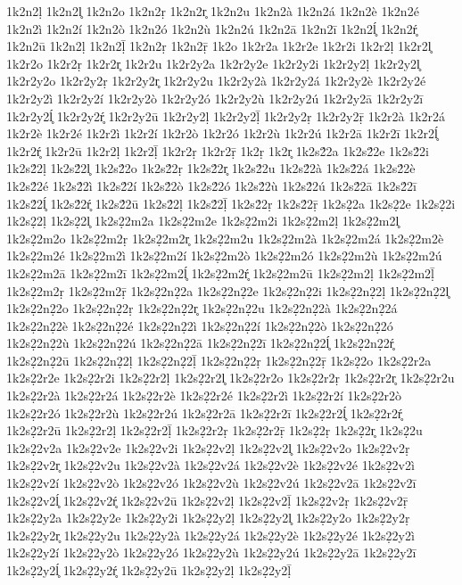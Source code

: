 {1k2n2ḷ
1k2n2l̥
1k2n2o
1k2n2ṛ
1k2n2r̥
1k2n2u
1k2n2à
1k2n2á
1k2n2è
1k2n2é
1k2n2ì
1k2n2í
1k2n2ò
1k2n2ó
1k2n2ù
1k2n2ú
1k2n2ā
1k2n2ī
1k2n2ĺ̥
1k2n2ŕ̥
1k2n2ū
1k2n2ḷ
1k2n2ḹ
1k2n2ṛ
1k2n2ṝ
1k2o
1k2r2a
1k2r2e
1k2r2i
1k2r2ḷ
1k2r2l̥
1k2r2o
1k2r2ṛ
1k2r2r̥
1k2r2u
1k2r2y2a
1k2r2y2e
1k2r2y2i
1k2r2y2ḷ
1k2r2y2l̥
1k2r2y2o
1k2r2y2ṛ
1k2r2y2r̥
1k2r2y2u
1k2r2y2à
1k2r2y2á
1k2r2y2è
1k2r2y2é
1k2r2y2ì
1k2r2y2í
1k2r2y2ò
1k2r2y2ó
1k2r2y2ù
1k2r2y2ú
1k2r2y2ā
1k2r2y2ī
1k2r2y2ĺ̥
1k2r2y2ŕ̥
1k2r2y2ū
1k2r2y2ḷ
1k2r2y2ḹ
1k2r2y2ṛ
1k2r2y2ṝ
1k2r2à
1k2r2á
1k2r2è
1k2r2é
1k2r2ì
1k2r2í
1k2r2ò
1k2r2ó
1k2r2ù
1k2r2ú
1k2r2ā
1k2r2ī
1k2r2ĺ̥
1k2r2ŕ̥
1k2r2ū
1k2r2ḷ
1k2r2ḹ
1k2r2ṛ
1k2r2ṝ
1k2ṛ
1k2r̥
1k2s2́2a
1k2s2́2e
1k2s2́2i
1k2s2́2ḷ
1k2s2́2l̥
1k2s2́2o
1k2s2́2ṛ
1k2s2́2r̥
1k2s2́2u
1k2s2́2à
1k2s2́2á
1k2s2́2è
1k2s2́2é
1k2s2́2ì
1k2s2́2í
1k2s2́2ò
1k2s2́2ó
1k2s2́2ù
1k2s2́2ú
1k2s2́2ā
1k2s2́2ī
1k2s2́2ĺ̥
1k2s2́2ŕ̥
1k2s2́2ū
1k2s2́2ḷ
1k2s2́2ḹ
1k2s2́2ṛ
1k2s2́2ṝ
1k2s2̣2a
1k2s2̣2e
1k2s2̣2i
1k2s2̣2ḷ
1k2s2̣2l̥
1k2s2̣2m2a
1k2s2̣2m2e
1k2s2̣2m2i
1k2s2̣2m2ḷ
1k2s2̣2m2l̥
1k2s2̣2m2o
1k2s2̣2m2ṛ
1k2s2̣2m2r̥
1k2s2̣2m2u
1k2s2̣2m2à
1k2s2̣2m2á
1k2s2̣2m2è
1k2s2̣2m2é
1k2s2̣2m2ì
1k2s2̣2m2í
1k2s2̣2m2ò
1k2s2̣2m2ó
1k2s2̣2m2ù
1k2s2̣2m2ú
1k2s2̣2m2ā
1k2s2̣2m2ī
1k2s2̣2m2ĺ̥
1k2s2̣2m2ŕ̥
1k2s2̣2m2ū
1k2s2̣2m2ḷ
1k2s2̣2m2ḹ
1k2s2̣2m2ṛ
1k2s2̣2m2ṝ
1k2s2̣2n2̣2a
1k2s2̣2n2̣2e
1k2s2̣2n2̣2i
1k2s2̣2n2̣2ḷ
1k2s2̣2n2̣2l̥
1k2s2̣2n2̣2o
1k2s2̣2n2̣2ṛ
1k2s2̣2n2̣2r̥
1k2s2̣2n2̣2u
1k2s2̣2n2̣2à
1k2s2̣2n2̣2á
1k2s2̣2n2̣2è
1k2s2̣2n2̣2é
1k2s2̣2n2̣2ì
1k2s2̣2n2̣2í
1k2s2̣2n2̣2ò
1k2s2̣2n2̣2ó
1k2s2̣2n2̣2ù
1k2s2̣2n2̣2ú
1k2s2̣2n2̣2ā
1k2s2̣2n2̣2ī
1k2s2̣2n2̣2ĺ̥
1k2s2̣2n2̣2ŕ̥
1k2s2̣2n2̣2ū
1k2s2̣2n2̣2ḷ
1k2s2̣2n2̣2ḹ
1k2s2̣2n2̣2ṛ
1k2s2̣2n2̣2ṝ
1k2s2̣2o
1k2s2̣2r2a
1k2s2̣2r2e
1k2s2̣2r2i
1k2s2̣2r2ḷ
1k2s2̣2r2l̥
1k2s2̣2r2o
1k2s2̣2r2ṛ
1k2s2̣2r2r̥
1k2s2̣2r2u
1k2s2̣2r2à
1k2s2̣2r2á
1k2s2̣2r2è
1k2s2̣2r2é
1k2s2̣2r2ì
1k2s2̣2r2í
1k2s2̣2r2ò
1k2s2̣2r2ó
1k2s2̣2r2ù
1k2s2̣2r2ú
1k2s2̣2r2ā
1k2s2̣2r2ī
1k2s2̣2r2ĺ̥
1k2s2̣2r2ŕ̥
1k2s2̣2r2ū
1k2s2̣2r2ḷ
1k2s2̣2r2ḹ
1k2s2̣2r2ṛ
1k2s2̣2r2ṝ
1k2s2̣2ṛ
1k2s2̣2r̥
1k2s2̣2u
1k2s2̣2v2a
1k2s2̣2v2e
1k2s2̣2v2i
1k2s2̣2v2ḷ
1k2s2̣2v2l̥
1k2s2̣2v2o
1k2s2̣2v2ṛ
1k2s2̣2v2r̥
1k2s2̣2v2u
1k2s2̣2v2à
1k2s2̣2v2á
1k2s2̣2v2è
1k2s2̣2v2é
1k2s2̣2v2ì
1k2s2̣2v2í
1k2s2̣2v2ò
1k2s2̣2v2ó
1k2s2̣2v2ù
1k2s2̣2v2ú
1k2s2̣2v2ā
1k2s2̣2v2ī
1k2s2̣2v2ĺ̥
1k2s2̣2v2ŕ̥
1k2s2̣2v2ū
1k2s2̣2v2ḷ
1k2s2̣2v2ḹ
1k2s2̣2v2ṛ
1k2s2̣2v2ṝ
1k2s2̣2y2a
1k2s2̣2y2e
1k2s2̣2y2i
1k2s2̣2y2ḷ
1k2s2̣2y2l̥
1k2s2̣2y2o
1k2s2̣2y2ṛ
1k2s2̣2y2r̥
1k2s2̣2y2u
1k2s2̣2y2à
1k2s2̣2y2á
1k2s2̣2y2è
1k2s2̣2y2é
1k2s2̣2y2ì
1k2s2̣2y2í
1k2s2̣2y2ò
1k2s2̣2y2ó
1k2s2̣2y2ù
1k2s2̣2y2ú
1k2s2̣2y2ā
1k2s2̣2y2ī
1k2s2̣2y2ĺ̥
1k2s2̣2y2ŕ̥
1k2s2̣2y2ū
1k2s2̣2y2ḷ
1k2s2̣2y2ḹ
}
